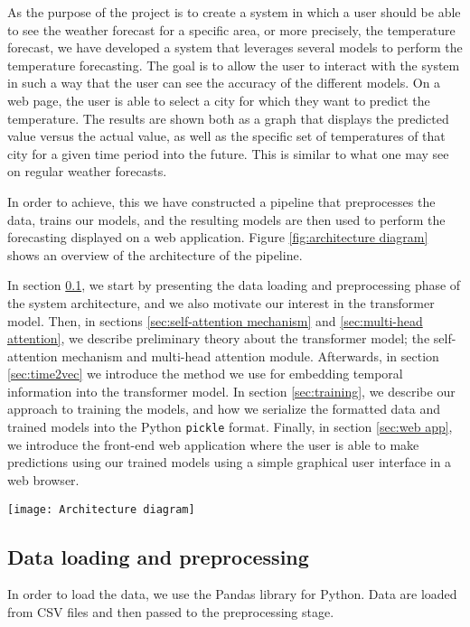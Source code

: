 As the purpose of the project is to create a system in which a user should be able to see the weather forecast for a specific area, or more precisely, the temperature forecast, we have developed a system that leverages several models to perform the temperature forecasting. 
The goal is to allow the user to interact with the system in such a way that the user can see the accuracy of the different models. 
On a web page, the user is able to select a city for which they want to predict the temperature. The results are shown both as a graph that displays the predicted value versus the actual value, as well as the specific set of temperatures of that city for a given time period into the future. This is similar to what one may see on regular weather forecasts.

In order to achieve, this we have constructed a pipeline that preprocesses the data, trains our models, and the resulting models are then used to perform the forecasting displayed on a web application. 
Figure \ref{fig:architecture diagram} shows an overview of the architecture of the pipeline.

In section \ref{sec:data loading and preprocessing}, we start by presenting the data loading and preprocessing phase of the system architecture, and we also motivate our interest in the transformer model.
Then, in sections \ref{sec:self-attention mechanism} and \ref{sec:multi-head attention}, we describe preliminary theory about the transformer model; the self-attention mechanism and multi-head attention module. 
Afterwards, in section \ref{sec:time2vec} we introduce the method we use for embedding temporal information into the transformer model. 
In section \ref{sec:training}, we describe our approach to training the models, and how we serialize the formatted data and trained models into the Python \texttt{pickle} format.
Finally, in section \ref{sec:web app}, we introduce the front-end web application where the user is able to make predictions using our trained models using a simple graphical user interface in a web browser.

\begin{figure*}
	\centering
	\texttt{[image: Architecture diagram]}
	\caption{The architecture of the system pipeline.}
	\label{fig:architecture diagram}
\end{figure*}

\subsection{Data loading and preprocessing}\label{sec:data loading and preprocessing}
In order to load the data, we use the Pandas library for Python.
Data are loaded from CSV files and then passed to the preprocessing stage.

